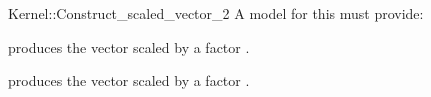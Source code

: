 \begin{ccRefFunctionObjectConcept}{Kernel::Construct_scaled_vector_2}
A model for this must provide:



            {produces the vector  scaled by a factor .}

            {produces the vector  scaled by a factor .}


\end{ccRefFunctionObjectConcept}
